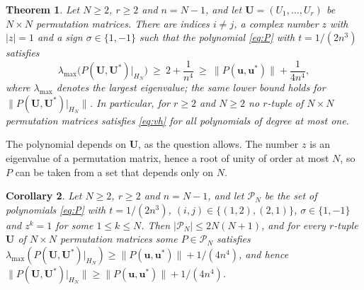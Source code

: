 \documentclass[11pt]{article}
\newtheorem{theorem}{Theorem}[section]
\newtheorem{corollary}[theorem]{Corollary}
\theoremstyle{remark}
\begin{document}
\begin{theorem}\label{thm:main}
Let $N\ge 2$, $r\ge 2$ and $n=N-1$, and let $\mathbf U=(U_1,\dots,U_r)$ be $N\times N$ permutation matrices.
There are indices $i\ne j$, a complex number $z$ with $|z|=1$ and a sign $\sigma\in\{1,-1\}$ such that the
polynomial \eqref{eq:P} with $t=1/(2n^3)$ satisfies
\[
  \lambda_{\max}\bigl(P(\mathbf U,\mathbf U^*)|_{H_N}\bigr)\ \ge\ 2+\frac1{n^4}\ \ge\ \|P(\mathbf u,\mathbf u^*)\|+\frac1{4n^4},
\]
where $\lambda_{\max}$ denotes the largest eigenvalue; the same lower bound holds for
$\|P(\mathbf U,\mathbf U^*)|_{H_N}\|$. In particular, for $r\ge 2$ and $N\ge 2$ no $r$-tuple of $N\times N$ permutation matrices satisfies \eqref{eq:vh}
for all polynomials of degree at most one.
\end{theorem}

The polynomial depends on $\mathbf U$, as the question allows. The number $z$ is an eigenvalue of a permutation
matrix, hence a root of unity of order at most $N$, so $P$ can be taken from a set that depends only on $N$.

\begin{corollary}\label{cor:family}
Let $N\ge 2$, $r\ge 2$ and $n=N-1$, and let $\mathcal P_N$ be the set of polynomials \eqref{eq:P} with $t=1/(2n^3)$,
$(i,j)\in\{(1,2),(2,1)\}$, $\sigma\in\{1,-1\}$ and $z^k=1$ for some $1\le k\le N$. Then $|\mathcal P_N|\le 2N(N+1)$,
and for every $r$-tuple $\mathbf U$ of $N\times N$ permutation matrices some $P\in\mathcal P_N$ satisfies
$\lambda_{\max}(P(\mathbf U,\mathbf U^*)|_{H_N})\ge\|P(\mathbf u,\mathbf u^*)\|+1/(4n^4)$, and hence
$\|P(\mathbf U,\mathbf U^*)|_{H_N}\|\ge\|P(\mathbf u,\mathbf u^*)\|+1/(4n^4)$.
\end{corollary}
\end{document}
